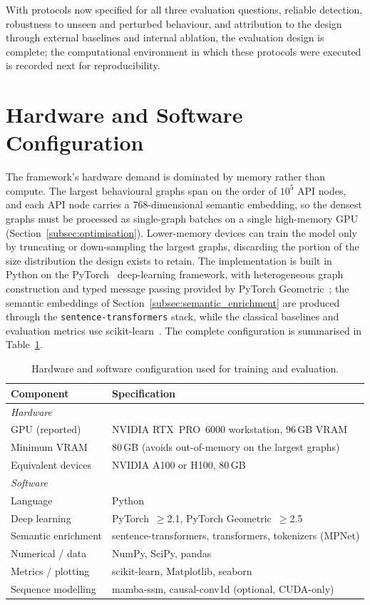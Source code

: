 \documentclass[%
    BCOR=10mm,
    DIV=13,
    toc=bibliography,
    toc=listof,
    oneside,
    12pt,
]{scrbook}
\begin{document}
With protocols now specified for all three evaluation questions, reliable
detection, robustness to unseen and perturbed behaviour, and attribution to the
design through external baselines and internal ablation, the evaluation design is
complete; the computational environment in which these protocols were executed is
recorded next for reproducibility.

\section{Hardware and Software Configuration}
\label{sec:hw_sw_config}

The framework's hardware demand is dominated by memory rather than compute. The
largest behavioural graphs span on the order of $10^5$ API nodes, and each API
node carries a 768-dimensional semantic embedding, so the densest graphs must be
processed as single-graph batches on a single high-memory GPU
(Section~\ref{subsec:optimisation}). Lower-memory devices can train the model
only by truncating or down-sampling the largest graphs, discarding the portion
of the size distribution the design exists to retain. The implementation is
built in Python on the PyTorch~\cite{paszke2019pytorch} deep-learning framework,
with
heterogeneous graph construction and typed message passing provided by PyTorch
Geometric~\cite{fey2019pyg}; the semantic embeddings of
Section~\ref{subsec:semantic_enrichment} are produced through the
\texttt{sentence-transformers} stack, while the classical baselines and
evaluation metrics use scikit-learn~\cite{pedregosa2011scikit}. The complete
configuration is summarised in Table~\ref{tab:hw_sw_config}.

\begin{table}[htbp]
\centering
\small
\caption{Hardware and software configuration used for training and evaluation.}
\label{tab:hw_sw_config}
\begin{tabular}{ll}
\toprule
\textbf{Component} & \textbf{Specification} \\
\midrule
\multicolumn{2}{l}{\textit{Hardware}} \\
GPU (reported)        & NVIDIA RTX~PRO~6000 workstation, 96\,GB VRAM \\
Minimum VRAM          & 80\,GB (avoids out-of-memory on the largest graphs) \\
Equivalent devices    & NVIDIA A100 or H100, 80\,GB \\
\midrule
\multicolumn{2}{l}{\textit{Software}} \\
Language              & Python \\
Deep learning         & PyTorch~$\geq$2.1, PyTorch Geometric~$\geq$2.5 \\
Semantic enrichment   & sentence-transformers, transformers, tokenizers (MPNet) \\
Numerical / data      & NumPy, SciPy, pandas \\
Metrics / plotting     & scikit-learn, Matplotlib, seaborn \\
Sequence modelling    & mamba-ssm, causal-conv1d (optional, CUDA-only) \\
\bottomrule
\end{tabular}
\end{table}
\end{document}
